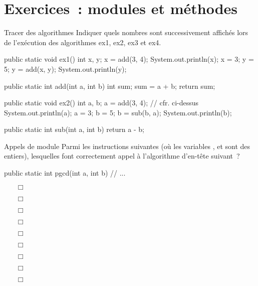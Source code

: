 \clearpage
\section{Exercices~: modules et méthodes}

		\begin{Exercice}{Tracer des algorithmes}
			Indiquer quels nombres sont successivement affichés 
			lors de l’exécution des algorithmes ex1, ex2, ex3 et ex4.

			\begin{java}
public static void ex1(){
	int x, y;
	x = add(3, 4);
	System.out.println(x);
	x = 3;
	y = 5;
	y = add(x, y);
	System.out.println(y);
}

public static int add(int a, int b){
	int sum;
	sum = a + b;
	return sum;
}
			\end{java}

			\begin{java}
public static void ex2(){
	int a, b;
	a = add(3, 4);		// cfr. ci-dessus
	System.out.println(a);
	a = 3;
	b = 5;
	b = sub(b, a);
	System.out.println(b);
}

public static int sub(int a, int b){
	return a - b;
}
			\end{java}

	\end{Exercice}

	\begin{Exercice}{Appels de module}
		Parmi les instructions suivantes (où les variables
		,  et 
		sont des entiers), lesquelles font correctement appel 
		à l’algorithme d’en-tête suivant~?

		\begin{java}
public static int pgcd(int a, int b){
	// ...
}
		\end{java}

		\begin{itemize}
			\item[$\Box$]  
			\item[$\Box$] 
			\item[$\Box$] 
			\item[$\Box$] 
			\item[$\Box$] 
			\item[$\Box$] 
			\item[$\Box$] 
			\item[$\Box$] 
			\item[$\Box$] 
		\end{itemize}

	\end{Exercice}

